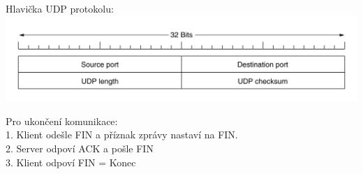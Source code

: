 \begin{multicols}{2}
  Hlavička UDP protokolu:   \\
  \includegraphics[width=\linewidth]{TVY-POS/ISO-OSI-TCP-IP/UDPheader.jpg}

  \columnbreak
  Pro ukončení komunikace:  \\
  1. Klient odešle FIN a příznak zprávy nastaví na FIN.  \\
  2. Server odpoví ACK a pošle FIN                       \\
  3. Klient odpoví FIN = Konec
\end{multicols}
